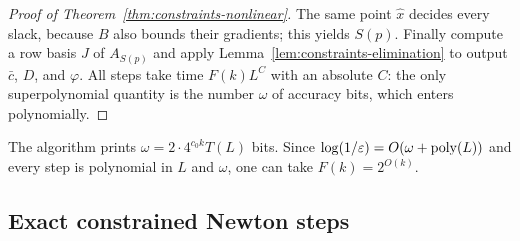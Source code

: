 \begin{proof}[Proof of Theorem~\ref{thm:constraints-nonlinear}]
The same point $\hat x$ decides every slack, because $B$ also bounds their
gradients; this yields $S(p)$. Finally compute a row basis $J$ of $A_{S(p)}$
and apply Lemma~\ref{lem:constraints-elimination} to output $\bar c$, $D$, and
$\varphi$. All steps take time $F(k)L^{C}$ with an absolute $C$: the only
superpolynomial quantity is the number $\omega$ of accuracy bits, which enters
polynomially.
\end{proof}

The algorithm prints $\omega=2\cdot4^{c_0k}T(L)$ bits. Since
$\log(1/\varepsilon)=O(\omega+\operatorname{poly}(L))$ and every step is polynomial in $L$
and $\omega$, one can take $F(k)=2^{O(k)}$.

\subsection{Exact constrained Newton steps}
\label{app:constraints-newton}

